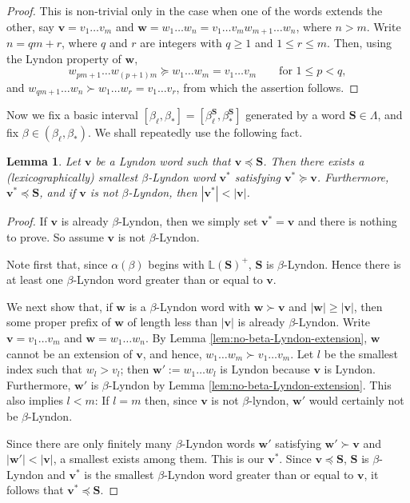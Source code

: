 \documentclass[11pt]{amsart}
\newtheorem{lemma}[theorem]{Lemma}
\theoremstyle{definition}
\theoremstyle{remark}
\numberwithin{equation}{section}
\renewcommand{\L}{\ensuremath{\mathbb{L}}}
\newcommand{\cs}{ {\mathbf{S}}}
\renewcommand{\v}{\mathbf{v}}
\newcommand{\w}{\mathbf{w}}
\newcommand{\al}{\alpha}
\newcommand{\lle}{\preccurlyeq}
\newcommand{\lge}{\succcurlyeq}
\newcommand{\La}{\Lambda}
\begin{document}
\begin{proof}
This is non-trivial only in the case when one of the words extends the other, say $\v=v_1\dots v_m$ and $\w=w_1\dots w_n=v_1\dots v_m w_{m+1}\dots w_n$, where $n>m$. Write $n=qm+r$, where $q$ and $r$ are integers with $q\geq 1$ and $1\leq r\leq m$. Then, using the Lyndon property of $\w$,
\[
w_{pm+1}\dots w_{(p+1)m}\lge w_1\dots w_m=v_1\dots v_m \qquad \mbox{for $1\leq p<q$},
\]
and $w_{qm+1}\dots w_n\succ w_1\dots w_r=v_1\dots v_r$, from which the assertion follows.
\end{proof}

Now we fix a basic interval $[\beta_\ell,\beta_*]=[\beta_\ell^{\cs},\beta_*^{\cs}]$ generated by a word $\cs\in\La$, and fix $\beta\in(\beta_\ell,\beta_*)$. We shall repeatedly use the following fact.

\begin{lemma} \label{lem:existence-of-v-star}
Let $\v$ be a Lyndon word such that $\v\lle \cs$. Then there exists a (lexicographically) smallest $\beta$-Lyndon word $\v^*$ satisfying $\v^*\lge \v$. Furthermore, $\v^*\lle \cs$, and if $\v$ is not $\beta$-Lyndon, then $|\v^*|<|\v|$.
\end{lemma}

\begin{proof}
If $\v$ is already $\beta$-Lyndon, then we simply set $\v^*=\v$ and there is nothing to prove. So assume $\v$ is not $\beta$-Lyndon.

Note first that, since $\al(\beta)$ begins with $\L(\cs)^+$, $\cs$ is $\beta$-Lyndon. Hence there is at least one $\beta$-Lyndon word greater than or equal to $\v$. 

We next show that, if $\w$ is a $\beta$-Lyndon word with $\w\succ\v$ and $|\w|\geq |\v|$, then some proper prefix of $\w$ of length less than $|\v|$ is already $\beta$-Lyndon. Write $\v=v_1\dots v_m$ and $\w=w_1\dots w_n$. By Lemma \ref{lem:no-beta-Lyndon-extension}, $\w$ cannot be an extension of $\v$, and hence, $w_1\dots w_m\succ v_1\dots v_m$. Let $l$ be the smallest index such that $w_l>v_l$; then {$\w':=w_1\dots w_l$ is Lyndon because $\v$ is Lyndon. Furthermore, $\w'$ is $\beta$-Lyndon by Lemma \ref{lem:no-beta-Lyndon-extension}. This also implies $l<m$: If $l=m$ then, since $\v$ is not $\beta$-lyndon, $\w'$ would certainly not be $\beta$-Lyndon.}

Since there are only finitely many $\beta$-Lyndon words $\w'$ satisfying $\w'\succ\v$ and $|\w'|<|\v|$, a smallest exists among them. This is our $\v^*$. Since $\v\lle\cs$, $\cs$ is $\beta$-Lyndon and $\v^*$ is the smallest $\beta$-Lyndon word greater than or equal to $\v$, it follows that $\v^*\lle \cs$.
\end{proof}
\end{document}
